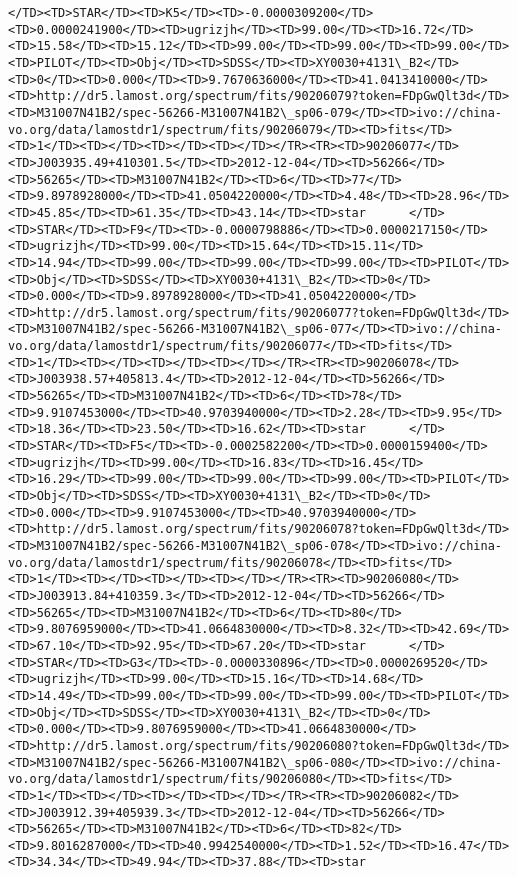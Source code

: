 \documentclass[11pt]{article}
\begin{document}
\begin{Verbatim}[commandchars=\\\{\}]
</TD><TD>STAR</TD><TD>K5</TD><TD>-0.0000309200</TD><TD>0.0000241900</TD><TD>ugrizjh</TD><TD>99.00</TD><TD>16.72</TD><TD>15.58</TD><TD>15.12</TD><TD>99.00</TD><TD>99.00</TD><TD>99.00</TD><TD>PILOT</TD><TD>Obj</TD><TD>SDSS</TD><TD>XY0030+4131\_B2</TD><TD>0</TD><TD>0.000</TD><TD>9.7670636000</TD><TD>41.0413410000</TD><TD>http://dr5.lamost.org/spectrum/fits/90206079?token=FDpGwQlt3d</TD><TD>M31007N41B2/spec-56266-M31007N41B2\_sp06-079</TD><TD>ivo://china-vo.org/data/lamostdr1/spectrum/fits/90206079</TD><TD>fits</TD><TD>1</TD><TD></TD><TD></TD><TD></TD></TR><TR><TD>90206077</TD><TD>J003935.49+410301.5</TD><TD>2012-12-04</TD><TD>56266</TD><TD>56265</TD><TD>M31007N41B2</TD><TD>6</TD><TD>77</TD><TD>9.8978928000</TD><TD>41.0504220000</TD><TD>4.48</TD><TD>28.96</TD><TD>45.85</TD><TD>61.35</TD><TD>43.14</TD><TD>star      </TD><TD>STAR</TD><TD>F9</TD><TD>-0.0000798886</TD><TD>0.0000217150</TD><TD>ugrizjh</TD><TD>99.00</TD><TD>15.64</TD><TD>15.11</TD><TD>14.94</TD><TD>99.00</TD><TD>99.00</TD><TD>99.00</TD><TD>PILOT</TD><TD>Obj</TD><TD>SDSS</TD><TD>XY0030+4131\_B2</TD><TD>0</TD><TD>0.000</TD><TD>9.8978928000</TD><TD>41.0504220000</TD><TD>http://dr5.lamost.org/spectrum/fits/90206077?token=FDpGwQlt3d</TD><TD>M31007N41B2/spec-56266-M31007N41B2\_sp06-077</TD><TD>ivo://china-vo.org/data/lamostdr1/spectrum/fits/90206077</TD><TD>fits</TD><TD>1</TD><TD></TD><TD></TD><TD></TD></TR><TR><TD>90206078</TD><TD>J003938.57+405813.4</TD><TD>2012-12-04</TD><TD>56266</TD><TD>56265</TD><TD>M31007N41B2</TD><TD>6</TD><TD>78</TD><TD>9.9107453000</TD><TD>40.9703940000</TD><TD>2.28</TD><TD>9.95</TD><TD>18.36</TD><TD>23.50</TD><TD>16.62</TD><TD>star      </TD><TD>STAR</TD><TD>F5</TD><TD>-0.0002582200</TD><TD>0.0000159400</TD><TD>ugrizjh</TD><TD>99.00</TD><TD>16.83</TD><TD>16.45</TD><TD>16.29</TD><TD>99.00</TD><TD>99.00</TD><TD>99.00</TD><TD>PILOT</TD><TD>Obj</TD><TD>SDSS</TD><TD>XY0030+4131\_B2</TD><TD>0</TD><TD>0.000</TD><TD>9.9107453000</TD><TD>40.9703940000</TD><TD>http://dr5.lamost.org/spectrum/fits/90206078?token=FDpGwQlt3d</TD><TD>M31007N41B2/spec-56266-M31007N41B2\_sp06-078</TD><TD>ivo://china-vo.org/data/lamostdr1/spectrum/fits/90206078</TD><TD>fits</TD><TD>1</TD><TD></TD><TD></TD><TD></TD></TR><TR><TD>90206080</TD><TD>J003913.84+410359.3</TD><TD>2012-12-04</TD><TD>56266</TD><TD>56265</TD><TD>M31007N41B2</TD><TD>6</TD><TD>80</TD><TD>9.8076959000</TD><TD>41.0664830000</TD><TD>8.32</TD><TD>42.69</TD><TD>67.10</TD><TD>92.95</TD><TD>67.20</TD><TD>star      </TD><TD>STAR</TD><TD>G3</TD><TD>-0.0000330896</TD><TD>0.0000269520</TD><TD>ugrizjh</TD><TD>99.00</TD><TD>15.16</TD><TD>14.68</TD><TD>14.49</TD><TD>99.00</TD><TD>99.00</TD><TD>99.00</TD><TD>PILOT</TD><TD>Obj</TD><TD>SDSS</TD><TD>XY0030+4131\_B2</TD><TD>0</TD><TD>0.000</TD><TD>9.8076959000</TD><TD>41.0664830000</TD><TD>http://dr5.lamost.org/spectrum/fits/90206080?token=FDpGwQlt3d</TD><TD>M31007N41B2/spec-56266-M31007N41B2\_sp06-080</TD><TD>ivo://china-vo.org/data/lamostdr1/spectrum/fits/90206080</TD><TD>fits</TD><TD>1</TD><TD></TD><TD></TD><TD></TD></TR><TR><TD>90206082</TD><TD>J003912.39+405939.3</TD><TD>2012-12-04</TD><TD>56266</TD><TD>56265</TD><TD>M31007N41B2</TD><TD>6</TD><TD>82</TD><TD>9.8016287000</TD><TD>40.9942540000</TD><TD>1.52</TD><TD>16.47</TD><TD>34.34</TD><TD>49.94</TD><TD>37.88</TD><TD>star      
\end{Verbatim}
\end{document}
